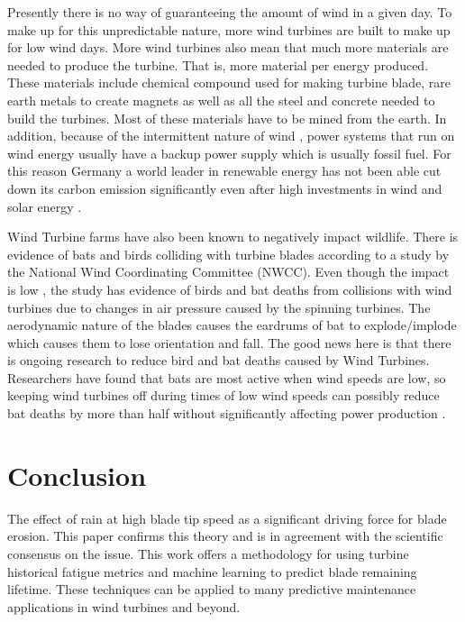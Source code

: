 \documentclass[runningheads]{llncs}
\begin{document}
Presently there is no way of guaranteeing the amount of wind in a given day. To make up for this unpredictable nature, more wind turbines are built to make up for low wind days. More wind turbines also mean that much more materials are needed to produce the turbine. That is, more material per energy produced. These materials include chemical compound used for making turbine blade, rare earth metals to create magnets as well as all the steel and concrete needed to build the turbines. Most of these materials have to be mined from the earth.
In addition, because of the intermittent nature of wind , power systems that run on wind energy usually have a backup power supply which is usually fossil fuel. For this reason Germany a world leader in renewable energy  has not been able cut down its carbon emission significantly even after high investments in wind and solar energy \cite{Germany}.

Wind Turbine farms have also been known to negatively impact wildlife. There is evidence of bats and birds colliding with turbine blades according to a study by the National Wind Coordinating Committee (NWCC)\cite{ethicswildlife}.  Even though the impact is low , the study has evidence of birds and bat deaths from collisions with wind turbines due to changes in air pressure caused by the spinning turbines. The aerodynamic nature of  the blades causes  the eardrums of bat to explode/implode which causes  them to lose orientation and fall.
The good news here is that there is ongoing research to reduce bird and bat deaths caused by Wind Turbines. Researchers have found that bats are most active when wind speeds are low, so keeping wind turbines off during times of low wind speeds can possibly reduce bat deaths by more than half without significantly affecting power production \cite{ethicswildlife}.

\section{Conclusion}
The effect of rain at high blade tip speed as a significant driving force for blade erosion. This paper confirms this theory and is in agreement with the scientific consensus on the issue\cite{rain}. This work offers a methodology for using turbine historical fatigue metrics and machine learning to predict blade remaining lifetime. These techniques can be applied to many predictive maintenance applications in wind turbines and beyond. 
\end{document}
